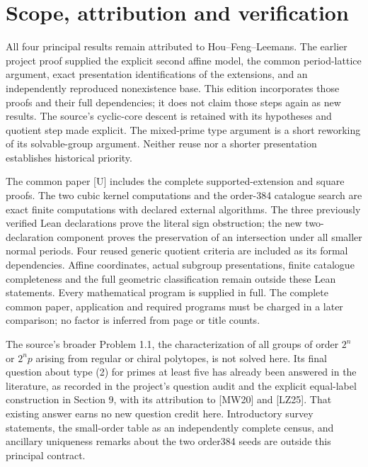 \section{Scope, attribution and verification}
All four principal results remain attributed to Hou--Feng--Leemans. The earlier project proof supplied the explicit second affine model, the common period-lattice argument, exact presentation identifications of the extensions, and an independently reproduced nonexistence base. This edition incorporates those proofs and their full dependencies; it does not claim those steps again as new results. The source's cyclic-core descent is retained with its hypotheses and quotient step made explicit. The mixed-prime type argument is a short reworking of its solvable-group argument. Neither reuse nor a shorter presentation establishes historical priority.

The common paper [U] includes the complete supported-extension and square proofs. The two cubic kernel computations and the order-384 catalogue search are exact finite computations with declared external algorithms. The three previously verified Lean declarations prove the literal sign obstruction; the new two-declaration component proves the preservation of an intersection under all smaller normal periods. Four reused generic quotient criteria are included as its formal dependencies. Affine coordinates, actual subgroup presentations, finite catalogue completeness and the full geometric classification remain outside these Lean statements. Every mathematical program is supplied in full. The complete common paper, application and required programs must be charged in a later comparison; no factor is inferred from page or title counts.

The source's broader Problem 1.1, the characterization of all groups of
order \(2^n\) or \(2^n p\) arising from regular or chiral polytopes, is not
solved here. Its final question about type (2) for primes at least five
has already been answered in the literature, as recorded in the
project's question audit and the explicit equal-label construction in Section 9, with its attribution to [MW20] and [LZ25]. That existing answer earns no new question credit here. Introductory
survey statements, the small-order table as an independently complete
census, and ancillary uniqueness remarks about the two order384 seeds
are outside this principal contract.
